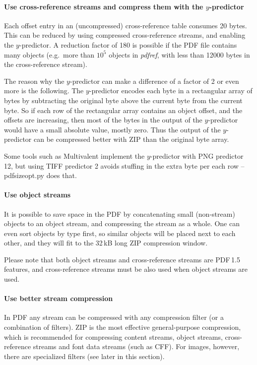 \documentclass{ltugproc}
\def\cmd{\textsf}
\begin{document}
\paragraph{Use cross-reference streams and compress them with the $y$-predictor}

Each offset entry in an (uncompressed) cross-reference table consumes 20
bytes. This can be reduced by using compressed cross-reference streams, and
enabling the $y$-predictor. A reduction factor of 180 is possible if the
PDF file contains many objects (e.g.\ more than $10^5$ objects in
\emph{pdfref}, with less than 12000 bytes in the cross-reference stream).

The reason why the $y$-predictor can make a difference of a factor of 2 or
even more is the following.
The $y$-predictor encodes each byte in a rectangular array of bytes by
subtracting the original byte above the current byte from the current byte.
So if each row of the rectangular array contains an object offset, and the
offsets are increasing, then most of the bytes in the output of the
$y$-predictor would have a small absolute value, mostly zero. Thus the
output of the $y$-predictor can be compressed better with ZIP than
the original byte array.

Some tools such as Multivalent implement the $y$-predictor with PNG
predictor 12, but using TIFF predictor 2 avoids stuffing in the extra byte
per each row -- \cmd{pdfsizeopt.py} does that.

\paragraph{Use object streams}

It is possible to save space in the PDF by concatenating small (non-stream)
objects to an object stream, and compressing the stream as a whole. One can
even sort objects by type first, so similar objects will be placed next to
each other, and they will fit to the 32\,kB long ZIP compression window.

Please note that both object streams and cross-reference streams are
PDF\,1.5 features, and cross-reference streams must be also used when object
streams are used.

\paragraph{Use better stream compression}

In PDF any stream can be compressed with any compression filter (or a
combination of filters). ZIP is the most effective general-purpose
compression, which is recommended for compressing content streams, object
streams, cross-reference streams and font data streams (such as CFF).
For images, however, there are specialized filters (see later in this
section).
\end{document}
